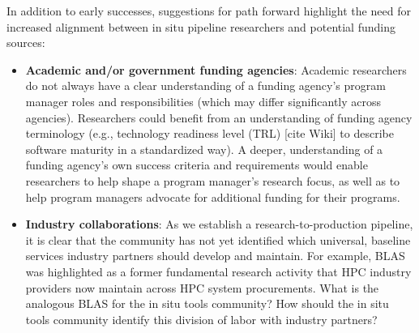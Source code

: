 In addition to early successes, suggestions for path forward highlight the need for increased alignment between in situ pipeline researchers and potential funding sources:
 \begin{itemize}
\item \textbf{Academic and/or government funding agencies}: Academic researchers do not always have a clear understanding of a funding agency’s program manager roles and responsibilities (which may differ significantly across agencies).  Researchers could benefit from an understanding of funding agency terminology (e.g., technology readiness level (TRL) [cite Wiki] to describe software maturity in a standardized way).  A deeper, understanding of a funding agency’s own success criteria and requirements would enable researchers to help shape a program manager’s research focus, as well as to help program managers  advocate for additional  funding for their programs.
 \item \textbf{Industry collaborations}:  As we establish a research-to-production pipeline, it is clear that the community has not yet identified which universal, baseline services industry partners should develop and maintain.  For example, BLAS was highlighted as a former fundamental research activity that HPC industry providers now maintain across HPC system procurements.  What is the analogous BLAS for the in situ tools community? How should the in situ tools community identify this division of labor with industry partners?
\end{itemize}
